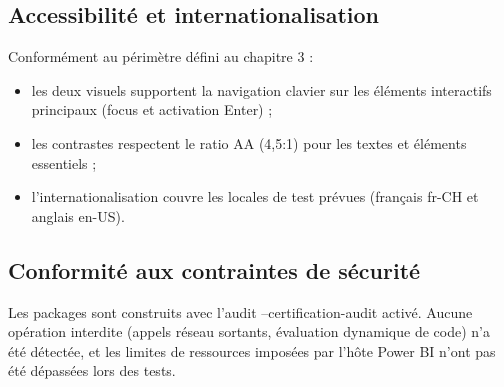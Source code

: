 \subsection{Accessibilité et internationalisation}

Conformément au périmètre défini au chapitre 3 :
\begin{itemize}
  \item les deux visuels supportent la navigation clavier sur les éléments interactifs principaux (focus et activation Enter) ;
  \item les contrastes respectent le ratio AA (4,5:1) pour les textes et éléments essentiels ;
  \item l’internationalisation couvre les locales de test prévues (français fr-CH et anglais en-US). 
\end{itemize}


\subsection{Conformité aux contraintes de sécurité}

Les packages sont construits avec l’audit --certification-audit activé. Aucune opération interdite (appels réseau sortants, évaluation dynamique de code) n’a été détectée, et les limites de ressources imposées par l’hôte Power BI n’ont pas été dépassées lors des tests.
